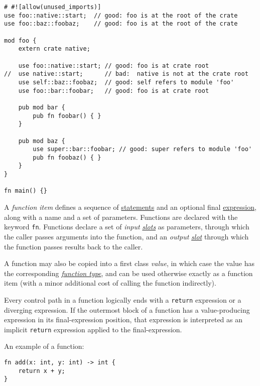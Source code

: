 \documentclass[]{article}
\begin{document}
\begin{verbatim}
# #![allow(unused_imports)]
use foo::native::start;  // good: foo is at the root of the crate
use foo::baz::foobaz;    // good: foo is at the root of the crate

mod foo {
    extern crate native;

    use foo::native::start; // good: foo is at crate root
//  use native::start;      // bad:  native is not at the crate root
    use self::baz::foobaz;  // good: self refers to module 'foo'
    use foo::bar::foobar;   // good: foo is at crate root

    pub mod bar {
        pub fn foobar() { }
    }

    pub mod baz {
        use super::bar::foobar; // good: super refers to module 'foo'
        pub fn foobaz() { }
    }
}

fn main() {}
\end{verbatim}


A \emph{function item} defines a sequence of
\hyperref[statements]{statements} and an optional final
\hyperref[expressions]{expression}, along with a name and a set of
parameters. Functions are declared with the keyword \texttt{fn}.
Functions declare a set of \emph{input}
\hyperref[memory-slots]{\emph{slots}} as parameters, through which the
caller passes arguments into the function, and an \emph{output}
\hyperref[memory-slots]{\emph{slot}} through which the function passes
results back to the caller.

A function may also be copied into a first class \emph{value}, in which
case the value has the corresponding
\hyperref[function-types]{\emph{function type}}, and can be used
otherwise exactly as a function item (with a minor additional cost of
calling the function indirectly).

Every control path in a function logically ends with a \texttt{return}
expression or a diverging expression. If the outermost block of a
function has a value-producing expression in its final-expression
position, that expression is interpreted as an implicit \texttt{return}
expression applied to the final-expression.

An example of a function:

\begin{verbatim}
fn add(x: int, y: int) -> int {
    return x + y;
}
\end{verbatim}
\end{document}
